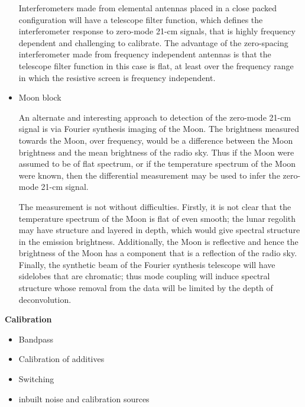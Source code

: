 \begin{itemize}
  Interferometers made from elemental antennas placed in a close packed configuration will have a telescope filter function, which defines the interferometer response to zero-mode 21-cm signals, that is highly frequency dependent and challenging to calibrate.  The advantage of the zero-spacing interferometer made from frequency independent antennas is that the telescope filter function in this case is flat, at least over the frequency range in which the resistive screen is frequency independent.  
  
  \item
  Moon block
  
  An alternate and interesting approach to detection of the zero-mode 21-cm signal is via Fourier synthesis imaging of the Moon.  The brightness measured towards the Moon, over frequency, would be a difference between the Moon brightness and the mean brightness of the radio sky.  Thus if the Moon were assumed to be of flat spectrum, or if the temperature spectrum of the Moon were known, then the differential measurement may be used to infer the zero-mode 21-cm signal.
  
  The measurement is not without difficulties.  Firstly, it is not clear that the temperature spectrum of the Moon is flat of even smooth; the lunar regolith may have structure and layered in depth, which would give spectral structure in the emission brightness.  Additionally, the Moon is reflective and hence the brightness of the Moon has a component that is a reflection of the radio sky. Finally, the synthetic beam of the Fourier synthesis telescope will have sidelobes that are chromatic; thus mode coupling will induce spectral structure whose removal from the data will be limited by the depth of deconvolution. 
    
\end{itemize}

\textbf{Calibration}

\begin{itemize}

    \item
    Bandpass 

    \item
    Calibration of additives





    \item
    Switching


    \item
    inbuilt noise and calibration sources
\end{itemize}

